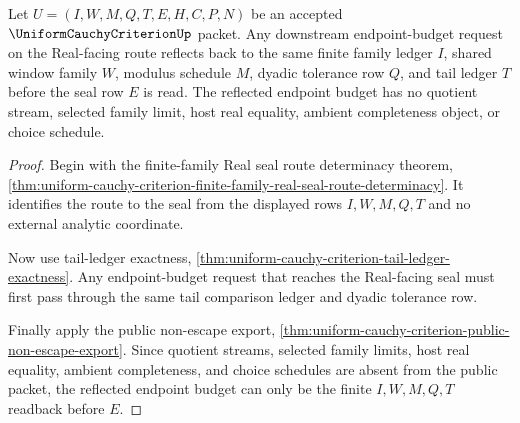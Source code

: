 \begin{theorem}
\label{thm:uniform-cauchy-criterion-endpoint-budget-reflector}
Let $U=(I,W,M,Q,T,E,H,C,P,N)$ be an accepted $\UniformCauchyCriterionUp$ packet. Any downstream endpoint-budget request on the Real-facing route reflects back to the same finite family ledger $I$, shared window family $W$, modulus schedule $M$, dyadic tolerance row $Q$, and tail ledger $T$ before the seal row $E$ is read. The reflected endpoint budget has no quotient stream, selected family limit, host real equality, ambient completeness object, or choice schedule.
\end{theorem}
\begin{proof}
Begin with the finite-family Real seal route determinacy theorem, \autoref{thm:uniform-cauchy-criterion-finite-family-real-seal-route-determinacy}. It identifies the route to the seal from the displayed rows $I,W,M,Q,T$ and no external analytic coordinate.

Now use tail-ledger exactness, \autoref{thm:uniform-cauchy-criterion-tail-ledger-exactness}. Any endpoint-budget request that reaches the Real-facing seal must first pass through the same tail comparison ledger and dyadic tolerance row.

Finally apply the public non-escape export, \autoref{thm:uniform-cauchy-criterion-public-non-escape-export}. Since quotient streams, selected family limits, host real equality, ambient completeness, and choice schedules are absent from the public packet, the reflected endpoint budget can only be the finite $I,W,M,Q,T$ readback before $E$.
\end{proof}


